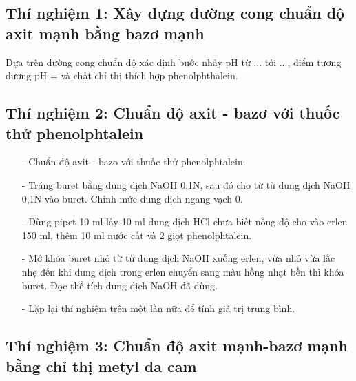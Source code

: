 \documentclass[12pt,a4paper]{report}
\begin{document}
\subsection*{Thí nghiệm 1: Xây dựng đường cong chuẩn độ axit mạnh bằng bazơ mạnh}

\begin{center}
\begin{table}[h!]
\end{table}
\end{center}
Dựa trên đường cong chuẩn độ xác định bước nhảy pH từ ... tới ..., điểm tương đương pH = và chất chỉ thị thích hợp phenolphthalein.

\subsection*{Thí nghiệm 2: Chuẩn độ axit - bazơ với thuốc thử phenolphtalein}

\begin{itemize}
    \item[-] Chuẩn độ axit - bazo với thuốc thử phenolphtalein.
    \item[-] Tráng buret bằng dung dịch NaOH 0,1N, sau đó cho từ từ dung dịch NaOH 0,1N vào buret. Chỉnh mức dung dịch ngang vạch 0.
    \item[-] Dùng pipet 10 ml lấy 10 ml dung dịch HCl chưa biết nồng độ cho vào erlen 150 ml, thêm 10 ml nước cất và 2 giọt phenolphtalein.
    \item[-] Mở khóa buret nhỏ từ từ dung dịch NaOH xuống erlen, vừa nhỏ vừa lắc nhẹ đến khi dung dịch trong erlen chuyển sang màu hồng nhạt bền thì khóa buret. Đọc thể tích dung dịch NaOH đã dùng.
    \item[-] Lặp lại thí nghiệm trên một lần nữa để tính giá trị trung bình.
\end{itemize}

\subsection*{Thí nghiệm 3: Chuẩn độ axit mạnh-bazơ mạnh bằng chỉ thị metyl da cam}
\end{document}
